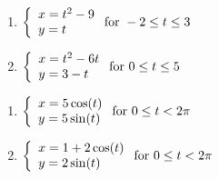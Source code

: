 \begin{multicols}{2}

\begin{enumerate}

\setcounter{enumi}{\value{HW}}

\item  ${\displaystyle \left\{ \begin{array}{l} x = t^2-9 \\ y = t  \end{array} \right. \vspace{.25in} \mbox{for } -2 \leq t \leq 3}$

\item  ${\displaystyle \left\{ \begin{array}{l} x = t^2-6t \\ y = 3-t  \end{array} \right. \vspace{.25in} \mbox{for } 0 \leq t \leq 5}$


\setcounter{HW}{\value{enumi}}

\end{enumerate}

\end{multicols}



\begin{multicols}{2}

\begin{enumerate}

\setcounter{enumi}{\value{HW}}
\item  ${\displaystyle \left\{ \begin{array}{l} x = 5\cos(t) \\ y = 5\sin(t)  \end{array} \right. \vspace{.25in} \mbox{for } 0 \leq t < 2\pi}$

\item  ${\displaystyle \left\{ \begin{array}{l} x = 1+2\cos(t) \\ y = 2\sin(t)  \end{array} \right. \vspace{.25in} \mbox{for } 0 \leq t < 2\pi}$


\setcounter{HW}{\value{enumi}}

\end{enumerate}

\end{multicols}


